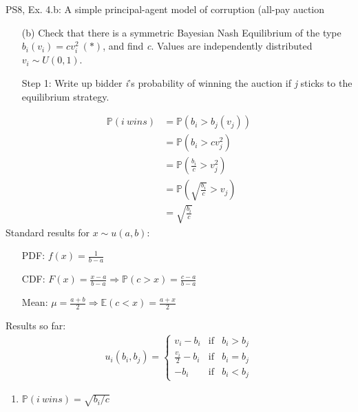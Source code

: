\begin{frame}{PS8, Ex. 4.b: A simple principal-agent model of corruption (all-pay auction}
    \begin{itemize}
      \item[(b)] Check that there is a symmetric Bayesian Nash Equilibrium of the type $b_i(v_i) = cv_i^2\ (*)$, and find \textit{c}. Values are independently distributed $v_i\sim U(0, 1)$.
    \end{itemize} \vspace{-8pt}
    \begin{multicols}{2}
      \begin{itemize}
        \item[Step 1:] Write up bidder \textit{i}'s probability of winning the auction if \textit{j} sticks to the equilibrium strategy.
      \end{itemize} \vspace{-8pt}
      \begin{align*}
        \mathbb{P}(i\ wins)&=\mathbb{P}(b_i>b_j(v_j))\\
                           &=\mathbb{P}(b_i>cv_j^2)\\
                           &=\mathbb{P}\left(\frac{b_i}{c}>v_j^2\right)\\
                           &=\mathbb{P}\left(\sqrt{\frac{b_i}{c}}>v_j\right)\\
                           &=\sqrt{\frac{b_i}{c}}
      \end{align*}
      \vfill\null\columnbreak
      Standard results for $x\sim u(a, b):$ \vspace{-6pt}
      \begin{itemize}
        \item[PDF:] $f(x)=\frac{1}{b-a}$
        \item[CDF:] $F(x)=\frac{x-a}{b-a}\Rightarrow\mathbb{P}(c>x)=\frac{c-a}{b-a}$
        \item[Mean:] $\mu=\frac{a+b}{2}\Rightarrow\mathbb{E}(c<x)=\frac{a+x}{2}$
      \end{itemize}
      \vspace{-6pt}
      Results so far: \vspace{-6pt}
      \begin{align*}
        u_i(b_i,b_j)=\left\{\begin{array}{lcl}
          v_i-b_i           & \text{if} & b_i>b_j \\
          \frac{v_i}{2}-b_i & \text{if} & b_i=b_j \\
          -b_i              & \text{if} & b_i<b_j
        \end{array}\right.
      \end{align*} \vspace{-16pt}
      \begin{enumerate}
        \item $\mathbb{P}(i\ wins)=\sqrt{b_i/c}$
      \end{enumerate}
      \vfill\null
    \end{multicols}
\end{frame}
